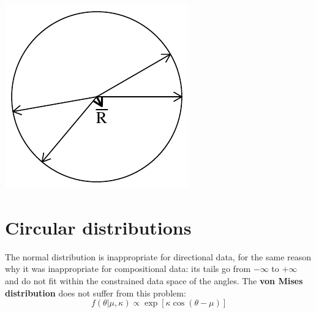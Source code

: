 \noindent\begin{minipage}[t][][b]{.2\textwidth}
\includegraphics[width=\textwidth]{../figures/lowconcentration.pdf}\medskip
\end{minipage}
\begin{minipage}[t][][t]{.8\textwidth}
  \label{fig:lowconcentration}
\end{minipage}

\section{Circular distributions}
\label{sec:circular-distributions}

The normal distribution is inappropriate for directional data, for the
same reason why it was inappropriate for compositional data: its tails
go from $-\infty$ to $+\infty$ and do not fit within the constrained
data space of the angles. The \textbf{von Mises distribution} does not
suffer from this problem:
\begin{equation}
  f(\theta|\mu,\kappa) \propto \exp[\kappa \cos(\theta-\mu)]
  \label{eq:vonMises}
\end{equation}

